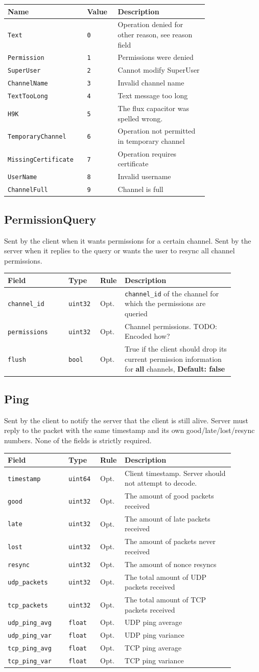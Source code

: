 \documentclass[11pt]{article} %
\newenvironment{mumbleMessageEx}
{%
	\small
	\renewcommand\arraystretch{1.5}
	\begin{tabular}{p{0.25\linewidth}p{0.13\linewidth}p{0.05\linewidth}p{0.45\linewidth}}
	Field & Type & Rule & Description \\
	\hline
}
{%
	\end{tabular}
	\renewcommand\arraystretch{1.0}
}
\newcommand{\mumbleMessageExItem}[4]{ \texttt{#1} & \texttt{#2} & #3 & #4 \\ }
\newenvironment{mumbleEnum}
{%
	\small
	\renewcommand\arraystretch{1.5}
	\begin{tabular}{p{0.25\linewidth}p{0.13\linewidth}p{0.4\linewidth}}
	Name & Value & Description \\
	\hline
}
{%
	\end{tabular}
	\renewcommand\arraystretch{1.0}
}
\newcommand{\mumbleEnumItem}[3]{ \texttt{#1} & \texttt{#2} & #3 \\ }
\begin{document}
\begin{mumbleEnum}
\mumbleEnumItem{Text}{0}{Operation denied for other reason, see reason field}
\mumbleEnumItem{Permission}{1}{Permissions were denied}
\mumbleEnumItem{SuperUser}{2}{Cannot modify SuperUser}
\mumbleEnumItem{ChannelName}{3}{Invalid channel name}
\mumbleEnumItem{TextTooLong}{4}{Text message too long}
\mumbleEnumItem{H9K}{5}{The flux capacitor was spelled wrong.}
\mumbleEnumItem{TemporaryChannel}{6}{Operation not permitted in temporary channel}
\mumbleEnumItem{MissingCertificate}{7}{Operation requires certificate}
\mumbleEnumItem{UserName}{8}{Invalid username}
\mumbleEnumItem{ChannelFull}{9}{Channel is full}
\end{mumbleEnum}

\subsection{PermissionQuery}
\label{msg:permissionQuery}

Sent by the client when it wants permissions for a certain channel. Sent by the server when it replies to the query or wants the user to resync all channel permissions.

\begin{mumbleMessageEx}
\mumbleMessageExItem{channel\_id}{uint32}{Opt.}{\texttt{channel\_id} of the channel for which the permissions are queried}
\mumbleMessageExItem{permissions}{uint32}{Opt.}{Channel permissions. TODO: Encoded how?}
\mumbleMessageExItem{flush}{bool}{Opt.}{True if the client should drop its current permission information for \textbf{all} channels, \textbf{Default: false}}
\end{mumbleMessageEx}

\subsection{Ping}
\label{msg:ping}

Sent by the client to notify the server that the client is still alive. Server must reply to the packet with the same timestamp and its own good/late/lost/resync numbers. None of the fields is strictly required.

\begin{mumbleMessageEx}
\mumbleMessageExItem{timestamp}{uint64}{Opt.}{Client timestamp. Server should not attempt to decode.}
\mumbleMessageExItem{good}{uint32}{Opt.}{The amount of good packets received}
\mumbleMessageExItem{late}{uint32}{Opt.}{The amount of late packets received}
\mumbleMessageExItem{lost}{uint32}{Opt.}{The amount of packets never received}
\mumbleMessageExItem{resync}{uint32}{Opt.}{The amount of nonce resyncs}
\mumbleMessageExItem{udp\_packets}{uint32}{Opt.}{The total amount of UDP packets received}
\mumbleMessageExItem{tcp\_packets}{uint32}{Opt.}{The total amount of TCP packets received}
\mumbleMessageExItem{udp\_ping\_avg}{float}{Opt.}{UDP ping average}
\mumbleMessageExItem{udp\_ping\_var}{float}{Opt.}{UDP ping variance}
\mumbleMessageExItem{tcp\_ping\_avg}{float}{Opt.}{TCP ping average}
\mumbleMessageExItem{tcp\_ping\_var}{float}{Opt.}{TCP ping variance}
\end{mumbleMessageEx}
\end{document}
